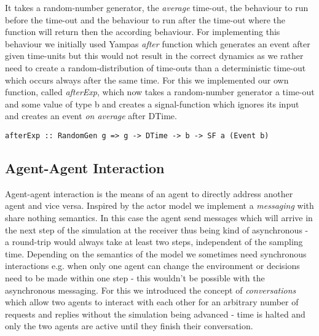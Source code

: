 It takes a random-number generator, the \textit{average} time-out, the behaviour to run before the time-out and the behaviour to run after the time-out where the function will return then the according behaviour. For implementing this behaviour we initially used Yampas \textit{after} function which generates an event after given time-units but this would not result in the correct dynamics as we rather need to create a random-distribution of time-outs than a deterministic time-out which occurs always after the same time. For this we implemented our own function, called \textit{afterExp}, which now takes a random-number generator a time-out and some value of type b and creates a signal-function which ignores its input and creates an event \textit{on average} after DTime.

\begin{verbatim}
afterExp :: RandomGen g => g -> DTime -> b -> SF a (Event b)
\end{verbatim}

\subsection{Agent-Agent Interaction}
Agent-agent interaction is the means of an agent to directly address another agent and vice versa. Inspired by the actor model we implement a  \textit{messaging} with share nothing semantics. In this case the agent send messages which will arrive in the next step of the simulation at the receiver thus being kind of asynchronous - a round-trip would always take at least two steps, independent of the sampling time. Depending on the semantics of the model we sometimes need synchronous interactions e.g. when only one agent can change the environment or decisions need to be made within one step - this wouldn't be possible with the asynchronous messaging. For this we introduced the concept of \textit{conversations} which allow two agents to interact with each other for an arbitrary number of requests and replies without the simulation being advanced - time is halted and only the two agents are active until they finish their conversation.

